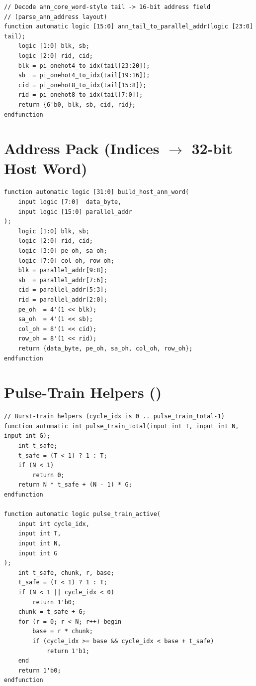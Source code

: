 \begin{lstlisting}[style=svstyle,
    caption={Packed-address decode from the 24-bit one-hot tail.},
    label={lst:addr-decode}]
// Decode ann_core_word-style tail -> 16-bit address field
// (parse_ann_address layout)
function automatic logic [15:0] ann_tail_to_parallel_addr(logic [23:0] tail);
    logic [1:0] blk, sb;
    logic [2:0] rid, cid;
    blk = pi_onehot4_to_idx(tail[23:20]);
    sb  = pi_onehot4_to_idx(tail[19:16]);
    cid = pi_onehot8_to_idx(tail[15:8]);
    rid = pi_onehot8_to_idx(tail[7:0]);
    return {6'b0, blk, sb, cid, rid};
endfunction
\end{lstlisting}

\section{Address Pack (Indices \(\rightarrow\) 32-bit Host Word)}
\label{app:listing-addr-pack}

\begin{lstlisting}[style=svstyle,
    caption={Inverse: build a 32-bit host word from a payload byte and
             packed 16-bit parallel address (used by both RTL paths and
             the testbenches).},
    label={lst:addr-pack}]
function automatic logic [31:0] build_host_ann_word(
    input logic [7:0]  data_byte,
    input logic [15:0] parallel_addr
);
    logic [1:0] blk, sb;
    logic [2:0] rid, cid;
    logic [3:0] pe_oh, sa_oh;
    logic [7:0] col_oh, row_oh;
    blk = parallel_addr[9:8];
    sb  = parallel_addr[7:6];
    cid = parallel_addr[5:3];
    rid = parallel_addr[2:0];
    pe_oh  = 4'(1 << blk);
    sa_oh  = 4'(1 << sb);
    col_oh = 8'(1 << cid);
    row_oh = 8'(1 << rid);
    return {data_byte, pe_oh, sa_oh, col_oh, row_oh};
endfunction
\end{lstlisting}

\section{Pulse-Train Helpers ()}
\label{app:listing-pulse-helpers}

\begin{lstlisting}[style=svstyle,
    caption={Pulse-train total/active helpers, from
             \sv{source/Controller/controller\_pkg.sv}.},
    label={lst:pulse-helpers}]
// Burst-train helpers (cycle_idx is 0 .. pulse_train_total-1)
function automatic int pulse_train_total(input int T, input int N, input int G);
    int t_safe;
    t_safe = (T < 1) ? 1 : T;
    if (N < 1)
        return 0;
    return N * t_safe + (N - 1) * G;
endfunction

function automatic logic pulse_train_active(
    input int cycle_idx,
    input int T,
    input int N,
    input int G
);
    int t_safe, chunk, r, base;
    t_safe = (T < 1) ? 1 : T;
    if (N < 1 || cycle_idx < 0)
        return 1'b0;
    chunk = t_safe + G;
    for (r = 0; r < N; r++) begin
        base = r * chunk;
        if (cycle_idx >= base && cycle_idx < base + t_safe)
            return 1'b1;
    end
    return 1'b0;
endfunction
\end{lstlisting}

